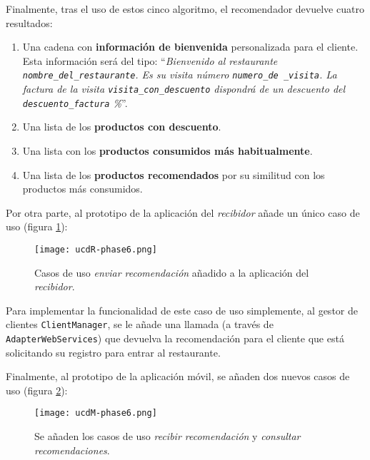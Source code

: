 Finalmente, tras el uso de estos cinco algoritmo, el recomendador devuelve 
cuatro resultados:
\begin{enumerate}
\item Una cadena con \textbf{información de bienvenida} personalizada para
el cliente. Esta información será del tipo: ``\emph{Bienvenido al restaurante
\texttt{nombre\_del\_restaurante}. Es su visita número \texttt{numero\_de
\_visita}. La factura de la visita \texttt{visita\_con\_descuento} dispondrá 
de un descuento del \texttt{descuento\_factura} \%}''.
\item Una lista de los \textbf{productos con descuento}.
\item Una lista con los \textbf{productos consumidos más habitualmente}.
\item Una lista de los \textbf{productos recomendados} por su similitud con
los productos más consumidos.
\end{enumerate}


Por otra parte, al prototipo de la aplicación del \emph{recibidor} añade un 
único caso de uso (figura \ref{fig:ucdR-phase6}):

  \begin{figure}[H]
    \begin{center}
      \texttt{[image: ucdR-phase6.png]}
      \caption{Casos de uso \emph{enviar recomendación} añadido a la aplicación 
      del \emph{recibidor}.}
      \label{fig:ucdR-phase6}
    \end{center}
  \end{figure}

Para implementar la funcionalidad de este caso de uso simplemente, al gestor de 
clientes \texttt{ClientManager}, se le añade una llamada (a través de
\texttt{AdapterWebServices}) que devuelva la recomendación para el cliente
que está solicitando su registro para entrar al restaurante.

Finalmente, al prototipo de la aplicación móvil, se añaden dos nuevos casos de 
uso (figura \ref{fig:ucdM-phase6}):

  \begin{figure}[H]
    \begin{center}
      \texttt{[image: ucdM-phase6.png]}
      \caption{Se añaden los casos de uso \emph{recibir recomendación} y
      \emph{consultar recomendaciones}.}
      \label{fig:ucdM-phase6}
    \end{center}
  \end{figure}

